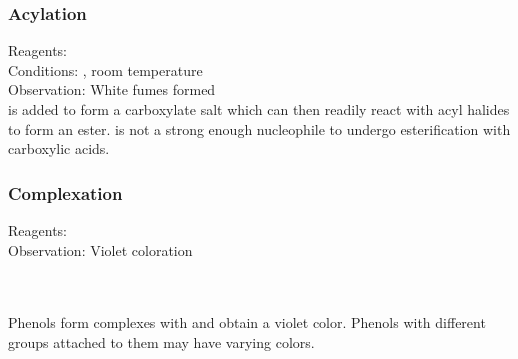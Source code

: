 \documentclass[../main]{subfiles}
\begin{document}
	\subsubsection{Acylation}

	Reagents:  \\
	Conditions: , room temperature \\
	Observation: White fumes formed  \\

	 is added to form a carboxylate salt which can then readily react with acyl halides to form an ester.  is not a strong enough nucleophile to undergo esterification with carboxylic acids. \\

	\subsubsection{Complexation}

	Reagents:  \\
	Observation: Violet coloration \\

	 \\
	 \\

	\vspace{12pt}

	Phenols form complexes with  and obtain a violet color. Phenols with different groups attached to them may have varying colors.

	
\end{document}
